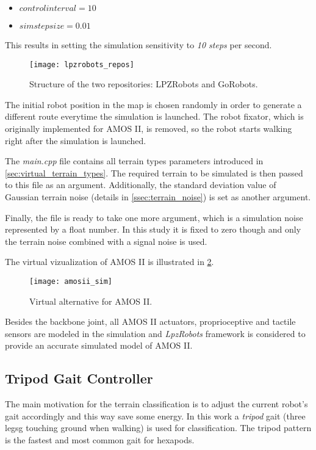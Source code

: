 \begin{itemize}
\item $ controlinterval = 10 $
\item $ simstepsize = 0.01 $
\end{itemize}

This results in setting the simulation sensitivity to \textit{10 steps} per second.

\begin{figure}[H]
  \centering
  \texttt{[image: lpzrobots\_repos]}
  \caption{Structure of the two repositories: LPZRobots and GoRobots. \citep{misc:lpzrobots}}
  \label{img:lpzrobots_repos}
\end{figure}

The initial robot position in the map is chosen randomly in order to generate a different route everytime the simulation is launched. The robot fixator, which is originally implemented for AMOS II, is removed, so the robot starts walking right after the simulation is launched.

The \textit{main.cpp} file contains all terrain types parameters introduced in \cref{sec:virtual_terrain_types}. The required terrain to be simulated is then passed to this file as an argument. Additionally, the standard deviation value of Gaussian terrain noise (details in \cref{ssec:terrain_noise}) is set as another argument. 

Finally, the file is ready to take one more argument, which is a simulation noise represented by a float number. In this study it is fixed to zero though and only the terrain noise combined with a signal noise is used.

The virtual vizualization of AMOS II is illustrated in \cref{img:amosii_sim}.

\begin{figure}[H]
  \centering
  \texttt{[image: amosii\_sim]}
  \caption{Virtual alternative for AMOS II.}
  \label{img:amosii_sim}
\end{figure}

Besides the backbone joint, all AMOS II actuators, proprioceptive and tactile sensors are modeled in the simulation and \textit{LpzRobots} framework is considered to provide an accurate simulated model of AMOS II.

\subsection{Tripod Gait Controller} \label{ssec:tripod_gait_controller}
The main motivation for the terrain classification is to adjust the current robot's gait accordingly and this way save some energy. In this work a \textit{tripod} gait (three legsg touching ground when walking) is used for classification. The tripod pattern is the fastest and most common gait for hexapods.

